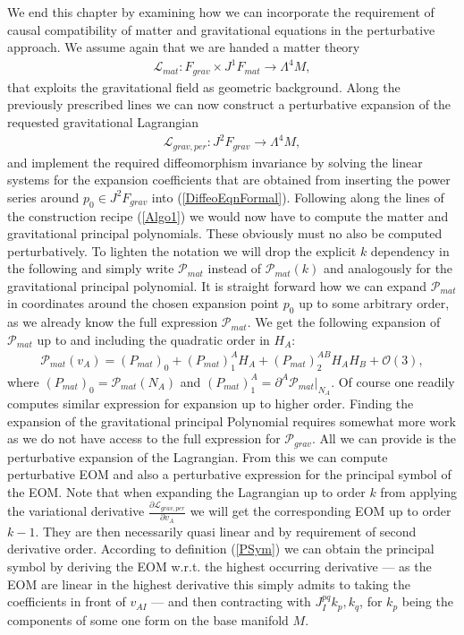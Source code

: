 \documentclass[a4paper,12pt, DIV=14, BCOR=5mm, twoside, headsepline]{scrbook}
\begin{document}
We end this chapter by examining how we can incorporate the requirement of causal compatibility of matter and gravitational equations in the perturbative approach.
We assume again that we are handed a matter theory 
\begin{align}
    \mathcal{L}_{mat} : F_{grav} \times J^1F_{mat} \longrightarrow \Lambda^4M,
\end{align}
that exploits the gravitational field as geometric background. Along the previously prescribed lines we can now construct a perturbative expansion of the requested gravitational Lagrangian
\begin{align}
    \mathcal{L}_{grav,per} : J^2F_{grav} \longrightarrow \Lambda^4M,
\end{align}
and implement the required diffeomorphism invariance by solving the linear systems for the expansion coefficients that are obtained from inserting the power series around $p_0 \in J^2F_{grav}$ into (\ref{DiffeoEqnFormal}). 
Following along the lines of the construction recipe (\ref{Algo1}) we would now have to compute the matter and gravitational principal polynomials.
These obviously must no also be computed perturbatively. 
To lighten the notation we will drop the explicit $k$ dependency in the following and simply write $\mathcal{P}_{mat}$ instead of $\mathcal{P}_{mat}(k)$ and analogously for the gravitational principal polynomial. It is straight forward how we can expand $\mathcal{P}_{mat}$ in coordinates around the chosen expansion point $p_0$ up to some arbitrary order, as we already know the full expression $\mathcal{P}_{mat}$. We get the following expansion of $\mathcal{P}_{mat}$ up to and including the quadratic order in $H_A$:
\begin{align}
    \mathcal{P}_{mat}(v_A) = (P_{mat})_{0} + (P_{mat})^A_1 H_A+ (P_{mat})^{AB}_2 H_A H_B +\mathcal{O}(3),
\end{align}
where $(P_{mat})_0 = \mathcal{P}_{mat}(N_A)$ and $(P_{mat})_1^A = \partial^A \mathcal{P}_{mat} \vert _{N_A}$. Of course one readily computes similar expression for expansion up to higher order. 
Finding the expansion of the gravitational principal Polynomial requires somewhat more work as we do not have access to the full expression for $\mathcal{P}_{grav}$. All we can provide is the perturbative expansion of the Lagrangian. From this we can compute perturbative EOM and also a perturbative expression for the principal symbol of the EOM.
Note that when expanding the Lagrangian up to order $k$ from applying the variational derivative $\frac{\partial\mathcal L_{grav,per}}{\partial v_A}$ we will get the corresponding EOM up to order $k-1$. They are then necessarily quasi linear and by requirement of second derivative order. According to definition (\ref{PSym}) we can obtain the principal symbol by deriving the EOM w.r.t. the highest occurring derivative  --- as the EOM are linear in the highest derivative this simply admits to taking the coefficients in front of $v_{AI}$ --- and then contracting with $J_I^{pq} k_p, k_q$, for $k_p$ being the components of some one form on the base manifold $M$. 
\end{document}
